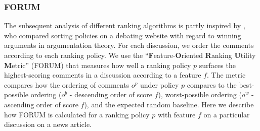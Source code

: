 \subsubsection{FORUM}
The subsequent analysis of different ranking algorithms is partly inspired by \citet{Young2021}, who compared sorting policies on a debating website with regard to winning arguments in argumentation theory. For each discussion, we order the comments according to each ranking policy. We use the ``\textbf{F}eature-\textbf{O}riented \textbf{R}anking \textbf{U}tility \textbf{M}etric'' (FORUM) that measures how well a ranking policy $p$ surfaces the highest-scoring comments in a discussion according to a feature $f$. The metric compares how the ordering of comments $o^p$ under policy $p$ compares to the best-possible ordering ($o^b$ - descending order of score $f$), worst-possible ordering ($o^w$ - ascending order of score $f$), and the expected random baseline. Here we describe how FORUM is calculated for a ranking policy $p$ with feature $f$ on a particular discussion on a news article.

